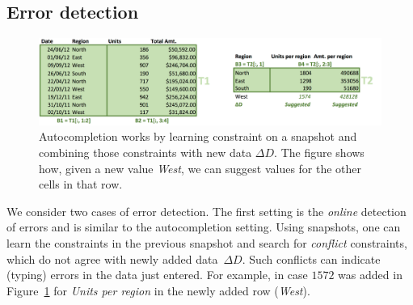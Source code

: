 \subsection{Error detection}
\begin{figure}[t]
\begin{center}
    \includegraphics[width=1.0\linewidth]{figures/Learning.png}
  \end{center}
  \caption{Autocompletion works by learning constraint on a snapshot and combining those constraints with new data $\Delta D$.
  The figure shows how, given a new value \textit{West}, we can suggest values for the other cells in that row.}
  \label{fig:autocompletion_example}
\end{figure}

We consider two cases of error detection.
The first setting is the \textit{online} detection of errors and is similar to the autocompletion setting.
Using snapshots, one can learn the constraints in the previous snapshot and search for \textit{conflict} constraints, which do not agree with newly added data~$\Delta D$.
Such conflicts can indicate (typing) errors in the data just entered. For example, in case $1572$ was added in Figure~\ref{fig:autocompletion_example} for \textit{Units per region} in the newly added row (\textit{West}).


